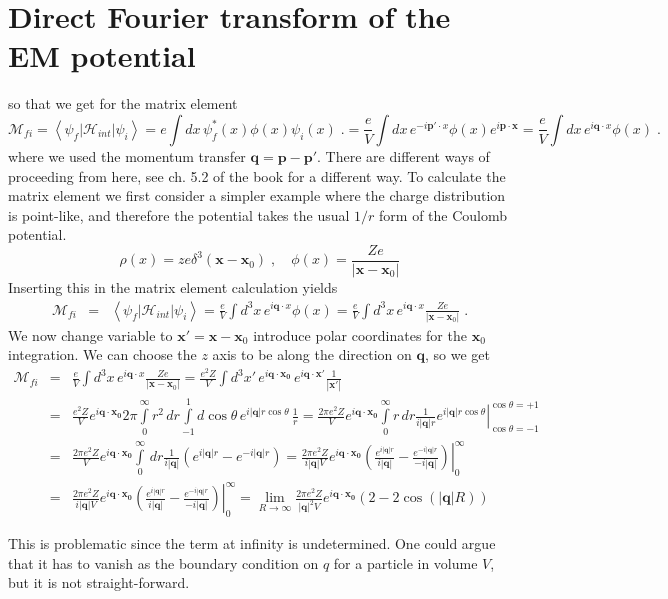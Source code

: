 \documentclass[12pt]{article}
\newcommand{\V}[1]{\mathbf{#1}}
\begin{document}
\section{Direct Fourier transform of the EM potential}
so that we get for the matrix element
\[\mathcal{M}_{fi}=\left<\psi_f|\mathcal{H}_{int}|\psi_i\right>
=e\int dx\,\psi_f^*(x)\phi(x)\psi_i(x)\;.
=\frac{e}{V}\int dx\,e^{-i\V{p'}\cdot x}\phi(x)e^{i\V{p}\cdot\V{x}}
=\frac{e}{V}\int dx\,e^{i\V{q}\cdot x}\phi(x)\;.
\]
where we used the momentum transfer $\V{q}=\V{p}-\V{p'}$. There are different ways of proceeding from here, see ch. 5.2 of the book for a different way. To calculate the matrix element we first consider a simpler example where the charge distribution is point-like, and therefore the potential takes the usual $1/r$ form of the Coulomb potential. 
\[\rho(x)=ze\delta^{3}(\V{x}-\V{x}_0)\;,\quad \phi(x)=\frac{Ze}{\left|\V{x}-\V{x}_0\right|}\] 
Inserting this in the matrix element calculation yields
\begin{eqnarray*}
\mathcal{M}_{fi}&=&\left<\psi_f|\mathcal{H}_{int}|\psi_i\right>
=\frac{e}{V}\int d^3x\,e^{i\V{q}\cdot x}\phi(x)
=\frac{e}{V}\int d^3x\,e^{i\V{q}\cdot x}\frac{Ze}{\left|\V{x}-\V{x}_0\right|}
\;.
\end{eqnarray*}
We now change variable to $\V{x'}=\V{x}-\V{x}_0$ introduce polar coordinates for the  $\V{x}_0$ integration. We can choose the $z$ axis to be along the direction on $\V{q}$, so we get
\begin{eqnarray*}
  \mathcal{M}_{fi}&=&\frac{e}{V}\int d^3x\,e^{i\V{q}\cdot x}\frac{Ze}{\left|\V{x}-\V{x}_0\right|}
  =\frac{e^2Z}{V}\int d^3x'\,e^{i\V{q}\cdot \V{x_0}}\,e^{i\V{q}\cdot \V{x'}}\frac{1}{\left|\V{x'}\right|}\\
  &=&\frac{e^2Z}{V}e^{i\V{q}\cdot \V{x_0}}2\pi\int\limits_0^\infty r^2\, dr\int\limits_{-1}^{1}d\cos\theta \,e^{i|\V{q}|r\cos\theta}\,\frac{1}{r}
  =\frac{2\pi e^2Z}{V}e^{i\V{q}\cdot \V{x_0}}\int\limits_0^\infty r\, dr\left. \frac{1}{i|\V{q}|r}e^{i|\V{q}|r\cos\theta}\right|_{\cos\theta=-1}^{\cos\theta=+1}\\
  &=&\frac{2\pi e^2Z}{V}e^{i\V{q}\cdot \V{x_0}}\int\limits_0^\infty \, dr \frac{1}{i|\V{q}|}\left(e^{i|\V{q}|r}-e^{-i|\V{q}|r}\right)=\frac{2\pi e^2Z}{i|\V{q}|V}e^{i\V{q}\cdot \V{x_0}} \left. \left(\frac{e^{i|\V{q}|r}}{i|\V{q}|}-\frac{e^{-i|\V{q}|r}}{-i|\V{q}|}\right)\right|_0^\infty
  \\
  &=&
  \frac{2\pi e^2Z}{i|\V{q}|V}e^{i\V{q}\cdot \V{x_0}} \left. \left(\frac{e^{i|\V{q}|r}}{i|\V{q}|}-\frac{e^{-i|\V{q}|r}}{-i|\V{q}|}\right)\right|_0^\infty= \lim\limits_{R\rightarrow \infty}\frac{2\pi e^2Z}{|\V{q}|^2V}e^{i\V{q}\cdot \V{x_0}}\left(2-2\cos(|\V{q}|R)\right)
\end{eqnarray*}

This is problematic since the term at infinity is undetermined. One could argue that it has to vanish as the boundary condition on $q$ for a particle in volume $V$, but it is not straight-forward. 



 
\end{document}
